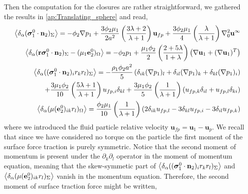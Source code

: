 
Then the computation for the closures are rather straightforward, we gathered the results in \ref{ap:Translating_sphere} and read, 
\begin{align}
    \left<\delta_\alpha ( \bm{\sigma}_1^0\cdot \textbf{n}_2 )_{\Sigma}\right> = 
    - \phi_2 \mathbf{\nabla} p_1
    + \frac{3\phi_2\mu_1}{2 a^2} 
    \left(\frac{3\lambda+2}{\lambda+1}\right) \textbf{u}_{f p} 
    + \frac{3\phi_2\mu_1}{4} \left(\frac{\lambda}{\lambda+1}\right)\mathbf{\nabla}^2_0\textbf{u}^\infty\\
    \label{eq:first_mom}
    \left<\delta_\alpha ( \textbf{r}\bm{\sigma}_1^0 \cdot \textbf{n}_2 )_{\Sigma} - ( \mu_1 \textbf{e}^0_2 )_{\Omega}\right> 
    = - \phi_2 p_1 + 
    \frac{\mu_1 \phi_2}{2} \left(\frac{2+5\lambda}{1+\lambda}\right)
         \left(\mathbf{\nabla} \textbf{u}_1+ (\mathbf{\nabla} \textbf{u}_1)^T\right)
        \\
        \left<\delta_\alpha ( (\bm{\sigma}_1^0 \cdot \textbf{n}_2)_ir_kr_l )_{\Sigma}\right> =
        - \frac{\rho_1\phi_2 a^2}{5}
        \left(
            \delta_{ik} (\mathbf{\nabla} p_1)_l
            +\delta_{il} (\mathbf{\nabla} p_1)_k
            +\delta_{kl} (\mathbf{\nabla} p_1)_i
        \right)\nonumber\\
        + \frac{3\mu_1\phi_2}{10}\left(\frac{5\lambda+1}{\lambda+1}\right)u_{fp,i}\delta_{kl}
        + \frac{3\mu_1\phi_2}{5}\left(\frac{1}{\lambda+1}\right)(u_{fp,k}\delta_{il}+u_{fp,l}\delta_{ki})
        \nonumber \\
        \left<\delta_\alpha ( {\mu(\textbf{e}_2^0)_{ik} r_l} )_{\Omega}\right> =
        \frac{\phi_2\mu_1}{10}\left(\frac{1}{\lambda+1}\right)
        \left(
            2\delta_{ik}u_{fp,l}
            -3\delta_{kl}u_{fp,i}
            -3\delta_{il}u_{fp,k}
        \right)
\end{align}
where we introduced the fluid particle relative velocity $\textbf{u}_{fp} = \textbf{u}_1-\textbf{u}_p$. 
We recall that since we have considered no torque on the particle the first moment of the surface force traction is purely symmetric. 
Notice that the second moment of momentum is present under the $\partial_k\partial_l$ operator in the moment of momentum equation, meaning that the skew-symmetic part of $\left<\delta_\alpha ( (\bm{\sigma}_1^0 \cdot \textbf{n}_2)_ir_kr_l )_{\Sigma}\right> $ and $\left<\delta_\alpha ( {\mu(\textbf{e}_2^0)_{ik} r_l} )_{\Sigma}\right>$ vanish in the momentum equation. 
Therefore, the second moment of surface traction force might be written, 
